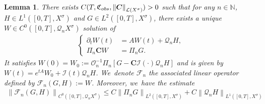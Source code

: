 \documentclass[11pt]{article}
\newtheorem{lemma}[theorem]{Lemma}
\theoremstyle{definition}
\let\mc\mathcal
\renewcommand{\O}{\mc{O}}
\newcommand{\N}{\mathbb{N}}
\newcommand{\Q}{\mathcal{Q}}
\newcommand{\bC}{\boldsymbol{C}}
\newcommand\nor[2]{\left\|#1\right\|_{#2}}
\newcommand\FL{\mathcal{F}_{n}}
\begin{document}
\begin{lemma}
\label{lmCauchyobs}
There exists $C(T,\mathfrak{C}_{\textup{obs}},\nor{\bC}{\mc{L}(X^\sigma)})>0$ such that for any $n\in\N$, $H\in L^{1}([0,T],X^{\sigma})$ and $G\in L^{2}([0,T],X^{\sigma})$, there exists a unique $W\in C^{0}([0,T],\Q_{n}X^{\sigma})$ solution of
\begin{align}\label{solprojectlin}
\left\{\begin{array}{rl}
\partial_t W(t)&=AW(t)+\Q_{n}H, \\[3pt]
\Pi_n\bC W &=\Pi_{n}G.
\end{array}\right.
\end{align}
It satisfies $W(0)= W_0:=\O_n^{-1}\Pi_n\left[G-\bC\mc{I}(\cdot)\Q_n H\right]$ and is given by $W(t)=e^{tA}W_{0}+\mc{I}(t)\Q_nH$. We~denote $\FL$ the associated linear operator defined by $\FL(G,H):=W$. Moreover, we~have the estimate
\begin{align}
\label{estimFL}
\nor{\FL(G,H)}{C^{0}([0,T],\Q_{n}X^{\sigma})}\leq C \nor{\Pi_{n}G}{L^{2}([0,T],X^{\sigma})}+C\nor{\Q_{n} H}{L^{1}([0,T],X^{\sigma})}
\end{align}
\end{lemma}
\end{document}
